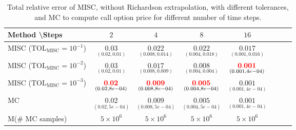 \begin{table}[h!]
	\centering
	\begin{tabular}{l*{6}{c}r}
		Method \textbackslash  Steps            & $2$ & $4$ & $8$ & $16$  \\
		\hline

		MISC ($\text{TOL}_{\text{MISC}}=10^{-1}$)  &  $\underset{(0.02,0.01)}{\mathbf{0.03}}$ & $\underset{(0.008,0.014)}{\mathbf{0.022}}$& $\underset{(0.004,0.018)}{\mathbf{ 0.022}}$ & $\underset{(0.001,0.016)}{\mathbf{ 0.017}}$   \\

		MISC ($\text{TOL}_{\text{MISC}}=10^{-2}$)  &  $\underset{(0.02,0.01)}{\mathbf{0.03}}$ & $\underset{(0.008,0.009)}{\mathbf{0.017}}$& $\underset{(0.004,0.004)}{\mathbf{ 0.008}}$ & $\underset{(0.001,4e-04)}{\mathbf{ {\color{red}0.001}}}$  \\
		MISC ($\text{TOL}_{\text{MISC}}=10^{-3}$)  &  $\underset{(0.02,8e-04)}{\mathbf{{\color{red}0.02}}}$ & $\underset{(0.008,8e-04)}{{\color{red}\mathbf{0.009}}}$& $\underset{(0.004,8e-04)}{\mathbf{{\color{red}0.005}}}$  & $\underset{(0.001,4e-04)}{\mathbf{ 0.001}}$  \\

		\hline
		MC    & $\underset{(0.02,5e-04)}{\mathbf{0.02}}$  &  $\underset{(0.008,5e-04)}{\mathbf{0.009}}$  & $\underset{(0.004,5e-04)}{\mathbf{0.005}}$ & $\underset{(0.001,4e-04)}{\mathbf{0.001}}$  \\	
			M(\# MC samples) 	& $5 \times 10^6$  &  $5 \times 10^6$  & $5 \times 10^6$ & $5 \times 10^6$  \\
		\hline
	\end{tabular}
	\caption{Total relative error of MISC, without Richardson extrapolation,  with different tolerances, and MC to compute call option price for different number of time steps.}
	\label{Total error of MISC and MC to compute Call option price of the different tolerances for different number of time steps. Case set 3, without Richardson extrapolation. The numbers between parentheses are the corresponding absolute errors.}
\end{table}


